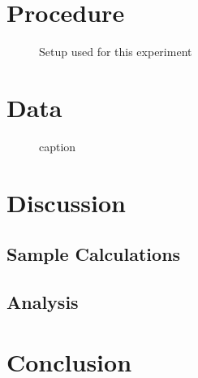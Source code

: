 \documentclass[11pt, titlepage]{article}
\begin{document}
\section*{Procedure}

\pagebreak
\begin{figure}[!ht]
\centering
\caption{Setup used for this experiment}
\end{figure}

\pagebreak
\section*{Data}
\begin{center}

\begin{figure}[!ht]
\caption{caption}
\end{figure}
\end{center}

\pagebreak
\section*{Discussion}
\subsection*{Sample Calculations}

\subsection*{Analysis}

\section*{Conclusion}
\end{document}
